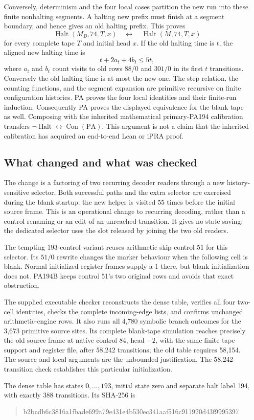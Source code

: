 Conversely, determinism and the four local cases partition the new run
into these finite nonhalting segments.  A halting new prefix must finish
at a segment boundary, and hence gives an old halting prefix.  This proves
\[
 \operatorname{Halt}(M_B,74,T,x)
 \quad\longleftrightarrow\quad
 \operatorname{Halt}(M,74,T,x)
\]
for every complete tape $T$ and initial head $x$.
If the old halting time is $t$, the aligned new halting time is
\[
 t+2a_t+4b_t\leq 5t,
\]
where $a_t$ and $b_t$ count visits to old rows $88/0$ and $301/0$ in its first
$t$ transitions.  Conversely the old halting time is at most the new one.
The step relation, the counting functions, and the segment expansion are
primitive recursive on finite configuration histories.  PA proves the
four local identities and their finite-run induction.  Consequently PA
proves the displayed equivalence for the blank tape as well.  Composing
with the inherited mathematical primary-PA194 calibration transfers
$\neg\operatorname{Halt}\leftrightarrow\operatorname{Con}(\mathrm{PA})$.
This argument is not a claim that the inherited calibration has acquired
an end-to-end Lean or iPRA proof.

\subsection{What changed and what was checked}
The change is a factoring of two recurring decoder readers through a
new history-sensitive selector.  Both successful paths and the extra
selector are exercised during the blank startup; the new helper is visited
55 times before the initial source frame.  This is an operational change
to recurring decoding, rather than a control renaming or an edit of an
unreached transition.  It gives no state saving: the dedicated selector
uses the slot released by joining the two old readers.

The tempting 193-control variant reuses arithmetic skip control 51 for
this selector.  Its $51/0$ rewrite changes the marker behaviour when the
following cell is blank.  Normal initialized register frames supply a 1
there, but blank initialization does not.  PA194B keeps control 51's two
original rows and avoids that exact obstruction.

The supplied executable checker reconstructs the dense table, verifies
all four two-cell identities, checks the complete incoming-edge lists,
and confirms unchanged arithmetic-engine rows.  It also runs all 4,780
symbolic branch outcomes for the 3,673 primitive source sites.  Its
complete blank-tape simulation reaches precisely the old source frame
at native control 84, head $-2$, with the same finite tape support and
register file, after 58,242 transitions; the old table requires 58,154.
The source and local arguments are the unbounded justification.  The
58,242-transition check establishes this particular initialization.

The dense table has states $0,\ldots,193$, initial state zero and separate
halt label 194, with exactly 388 transitions.  Its SHA-256 is
\begin{quote}\ttfamily\small
b2bcdb6c3816a1fbade699a79e431e4b530ec341aaf516c911920d43f9995397
\end{quote}
